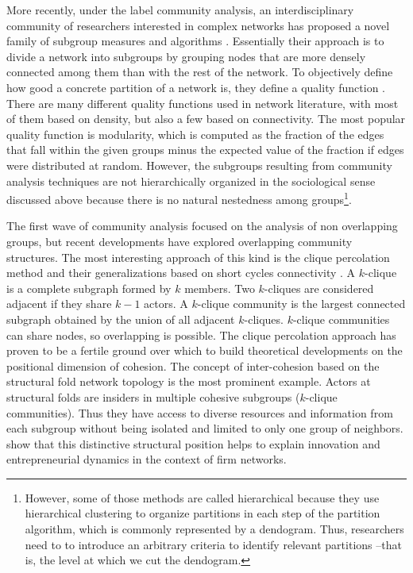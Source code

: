 More recently, under the label community analysis, an interdisciplinary community of researchers interested in complex networks has proposed a novel family of subgroup measures and algorithms \citep{fortunato:2010}. Essentially their approach is to divide a network into subgroups by grouping nodes that are more densely connected among them than with the rest of the network. To objectively define how good a concrete partition of a network is, they define a quality function \citep{brandes:2005,fortunato:2010}. There are many different quality functions used in network literature, with most of them based on density, but also a few based on connectivity. The most popular quality function is modularity, which is computed as the fraction of the edges that fall within the given groups minus the expected value of the fraction if edges were distributed at random. However, the subgroups resulting from community analysis techniques are not hierarchically organized in the sociological sense discussed above because there is no natural nestedness among groups\footnote{However, some of those methods are called hierarchical because they use hierarchical clustering to organize partitions in each step of the partition algorithm, which is commonly represented by a dendogram. Thus, researchers need to to introduce an arbitrary criteria to identify relevant partitions --that is, the level at which we cut the dendogram.}.

The first wave of community analysis focused on the analysis of non overlapping groups, but recent developments have explored overlapping community structures. The most interesting approach of this kind is the clique percolation method \citep*{palla:2005} and their generalizations based on short cycles connectivity \citep{batagelj:2007}. A $k$-clique is a complete subgraph formed by $k$ members. Two $k$-cliques are considered adjacent if they share $k-1$ actors. A $k$-clique community is the largest connected subgraph obtained by the union of all adjacent $k$-cliques. $k$-clique communities can share nodes, so overlapping is possible. The clique percolation approach has proven to be a fertile ground over which to build theoretical developments on the positional dimension of cohesion. The concept of inter-cohesion based on the structural fold network topology \citep{stark:2010} is the most prominent example. Actors at structural folds are insiders in multiple cohesive subgroups ($k$-clique communities). Thus they have access to diverse resources and information from each subgroup without being isolated and limited to only one group of neighbors. \citeauthor{stark:2010} show that this distinctive structural position helps to explain innovation and entrepreneurial dynamics in the context of firm networks.

